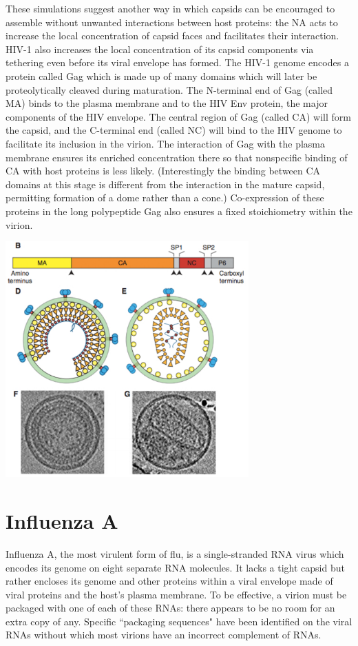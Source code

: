 \documentclass{article}
\begin{document}
These simulations suggest another way in which capsids can be encouraged to assemble without unwanted interactions between host proteins: the NA acts to increase the local concentration of capsid faces and facilitates their interaction. HIV-1 also increases the local concentration of its capsid components via tethering even before its viral envelope has formed. The HIV-1 genome encodes a protein called Gag which is made up of many domains which will later be proteolytically cleaved during maturation. The N-terminal end of Gag (called MA) binds to the plasma membrane and to the HIV Env protein, the major components of the HIV envelope. The central region of Gag (called CA) will form the capsid, and the C-terminal end (called NC) will bind to the HIV genome to facilitate its inclusion in the virion. The interaction of Gag with the plasma membrane ensures its enriched concentration there so that nonspecific binding of CA with host proteins is less likely. (Interestingly the binding between CA domains at this stage is different from the interaction in the mature capsid, permitting formation of a dome rather than a cone.) Co-expression of these proteins in the long polypeptide Gag also ensures a fixed stoichiometry within the virion.

\begin{center}
\includegraphics[width=0.7\textwidth]{hiv.pdf}
\end{center}


\section*{Influenza A}

Influenza A, the most virulent form of flu, is a single-stranded RNA virus which encodes its genome on eight separate RNA molecules. It lacks a tight capsid but rather encloses its genome and other proteins within a viral envelope made of viral proteins and the host's plasma membrane. To be effective, a virion must be packaged with one of each of these RNAs: there appears to be no room for an extra copy of any. Specific ``packaging sequences" have been identified on the viral RNAs without which most virions have an incorrect complement of RNAs.
\end{document}

